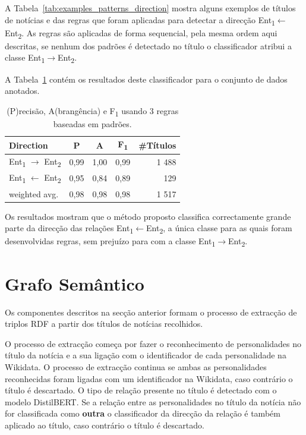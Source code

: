 \documentclass[a4paper, twocolumn, 11pt, twoside]{article}
\begin{document}
A Tabela~\ref{tab:examples_patterns_direction} mostra alguns exemplos de títulos de notícias e das regras que foram aplicadas para detectar a direcção Ent\textsubscript{1}$\leftarrow$Ent\textsubscript{2}. As regras são aplicadas de forma sequencial, pela mesma ordem aqui descritas, se nenhum dos padrões é detectado no título o classificador atribui a classe {Ent\textsubscript{1}$\rightarrow$Ent\textsubscript{2}}.

A Tabela~\ref{tab:direction_clf_results} contém os resultados deste classificador para o conjunto de dados anotados.

\begin{table}[!h]
    \begin{center}
    \begin{tabular}{l cccr}
        {\bf Direction} & {\bf P} & {\bf A} & {\bf F\textsubscript{1}} & {\bf \#Títulos} \\
        \hline
        \small{Ent\textsubscript{1} $\rightarrow$ Ent\textsubscript{2}} & 0,99  &  1,00  &  0,99  & 1 488 \\
		\small{Ent\textsubscript{1} $\leftarrow$ Ent\textsubscript{2}}  & 0,95  &  0,84  &  0,89  &   129  \\
		\hline
	    weighted avg.     &      0,98       & 0,98       & 0,98		&   1 517 \\
    \end{tabular}
	\caption{(P)recisão, A(brangência) e F\textsubscript{1} usando 3 regras baseadas em padrões.}
	\label{tab:direction_clf_results}
	\end{center}
\end{table}

Os resultados mostram que o método proposto classifica correctamente grande parte da direcção das relações Ent\textsubscript{1}$\leftarrow$Ent\textsubscript{2}, a única classe para as quais foram desenvolvidas regras, sem prejuízo para com a classe Ent\textsubscript{1}$\rightarrow$Ent\textsubscript{2}.

\section{Grafo Semântico}
\label{sec:pipeline}

Os componentes descritos na secção anterior formam o processo de extracção de triplos RDF a partir dos títulos de notícias recolhidos.

O processo de extracção começa por fazer o reconhecimento de personalidades no título da notícia e a sua ligação com o identificador de cada personalidade na Wikidata. O processo de extracção continua se ambas as personalidades reconhecidas foram ligadas com um identificador na Wikidata, caso contrário o título é descartado. O tipo de relação presente no título é detectado com o modelo DistilBERT. Se a relação entre as personalidades no título da notícia não for classificada como \textbf{outra} o classificador da direcção da relação é também aplicado ao título, caso contrário o título é descartado.
\end{document}
